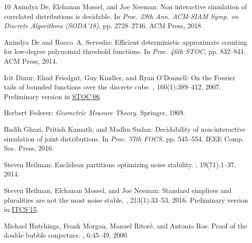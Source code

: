 \documentclass[11pt]{article}
\numberwithin{equation}{section}
\theoremstyle{definition}
\theoremstyle{plain}
\begin{document}
\begin{thebibliography}{10}
{\sc Anindya De, Elchanan Mossel, and Joe Neeman}: Non interactive simulation
  of correlated distributions is decidable.
\newblock In {\em Proc. 29th Ann. ACM-SIAM Symp. on Discrete Algorithms
  (SODA'18)}, pp. 2728--2746. ACM Press, 2018.

{\sc Anindya De and Rocco~A. Servedio}: {Efficient deterministic approximate
  counting for low-degree polynomial threshold functions}.
\newblock In {\em Proc. 46th STOC}, pp. 832--841. ACM Press, 2014.

{\sc Irit Dinur, Ehud Friedgut, Guy Kindler, and Ryan O'Donnell}: {On the
  Fourier tails of bounded functions over the discrete cube}.
, 160(1):389--412, 2007.
\newblock Preliminary version in
  \href{https://dl.acm.org/citation.cfm?id=1132580}{STOC'06}.
\newblock [\epfmtdoi{10.1007/s11856-007-0068-9}]

{\sc Herbert Federer}: {\em Geometric Measure Theory}.
\newblock Springer, 1969.
\newblock [\epfmtdoi{10.1007/978-3-642-62010-2}]

{\sc Badih Ghazi, Pritish Kamath, and Madhu Sudan}: Decidability of
  non-interactive simulation of joint distributions.
\newblock In {\em Proc. 57th FOCS}, pp. 545--554. IEEE Comp. Soc. Press, 2016.

{\sc Steven Heilman}: Euclidean partitions optimizing noise stability.
, 19(71):1--37, 2014.

{\sc Steven Heilman, Elchanan Mossel, and Joe Neeman}: Standard simplices and
  pluralities are not the most noise stable.
, 213(1):33--53, 2016.
\newblock Preliminary version in
  \href{https://dl.acm.org/citation.cfm?doid=2688073.2688076}{ITCS'15}.

{\sc Michael Hutchings, Frank Morgan, Manuel Ritor{\'e}, and Antonio Ros}:
  Proof of the double bubble conjecture.
, 6:45--49, 2000.


\end{thebibliography}
\end{document}

